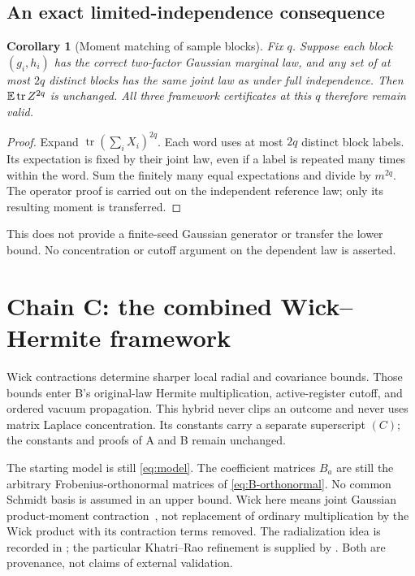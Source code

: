 \documentclass[11pt]{article}
\numberwithin{equation}{section}
\newtheorem{corollary}[theorem]{Corollary}
\theoremstyle{definition}\newtheorem{definition}[theorem]{Definition}
\theoremstyle{remark}\newtheorem{remark}[theorem]{Remark}
\newcommand{\tr}{\operatorname{tr}}\newcommand{\Ent}{\operatorname{Ent}}
\begin{document}
\subsection{An exact limited-independence consequence}
\begin{corollary}[Moment matching of sample blocks]\label{cor:limited}
Fix $q$. Suppose each block $(g_i,h_i)$ has the correct two-factor Gaussian
marginal law, and any set of at most $2q$ distinct blocks has the same joint law
as under full independence. Then $\E\tr Z^{2q}$ is unchanged. All three
framework certificates at this $q$ therefore remain valid.
\end{corollary}
\begin{proof}
Expand $\tr(\sum_iX_i)^{2q}$. Each word uses at most $2q$ distinct block labels.
Its expectation is fixed by their joint law, even if a label is repeated many
times within the word. Sum the finitely many equal expectations and divide by
$m^{2q}$. The operator proof is carried out on the independent reference law;
only its resulting moment is transferred.
\end{proof}
This does not provide a finite-seed Gaussian generator or transfer the lower
bound. No concentration or cutoff argument on the dependent law is asserted.

\clearpage
\section{Chain C: the combined Wick--Hermite framework}\label{sec:C}
\begin{takeaway}[colframe=Amber!80,coltitle=Amber,title={A third proof chain, not a replacement for B}]
Wick contractions determine sharper local radial and covariance bounds.
Those bounds enter B's original-law Hermite multiplication, active-register
cutoff, and ordered vacuum propagation. This hybrid never clips an outcome and
never uses matrix Laplace concentration. Its constants carry a separate
superscript $(C)$; the constants and proofs of A and B remain unchanged.
\end{takeaway}

The starting model is still \eqref{eq:model}. The coefficient matrices $B_a$
are still the arbitrary Frobenius-orthonormal matrices of
\eqref{eq:B-orthonormal}. No common Schmidt basis is assumed in an upper bound.
Wick here means joint Gaussian product-moment contraction~\cite{Isserlis,Janson},
not replacement of ordinary multiplication by the Wick product with its
contraction terms removed. The radialization idea is recorded in
\cite{RMPS}; the particular Khatri--Rao refinement is supplied by
\cite{WickNote}. Both are provenance, not claims of external validation.
\end{document}
